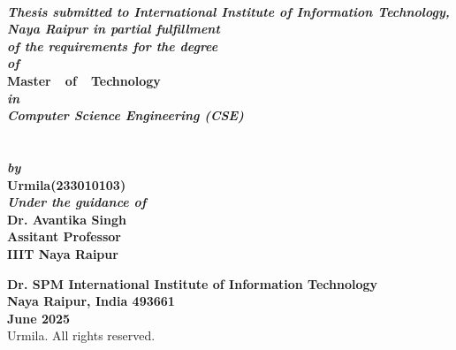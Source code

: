 \thispagestyle{plain}
\begin{center}
 {\huge \bf \\}
\vspace*{1.2cm}
{\bf{ \textit {Thesis submitted to International Institute of Information Technology, Naya Raipur in partial fulfillment \\
	of the requirements for the degree}}}\\ 
\vspace*{0.5cm}
{\bf{ \textit {of}}}\\
\vspace*{0.5cm}
{\Large {\bf Master\ \ of\ \ Technology}}\\
\vspace*{0.5cm}
{\bf{ \textit {in}}}\\
\vspace*{0.5cm}
{\bf{ \textit {Computer Science Engineering (CSE)}}}\\
\vspace*{0.5cm}\\
\vspace*{0.5cm}\\
{\bf{ \textit { by}}}\\
\vspace*{0.5cm}
{\Large{\bf Urmila(233010103)}}\\
\vspace*{1cm}
\bf{ \textit { Under the guidance of }}\\
\vspace*{0.5cm}
{{\bf Dr. Avantika Singh}}\\
\vspace*{0.40cm}
{{\bf Assitant Professor}}\\
\vspace*{0.40cm}
{{\bf IIIT Naya Raipur}}\\
\vspace*{0.10cm}
\begin{figure}[htbp]
  \centerline{}
\end{figure}
\vspace*{0.08cm}
{\Large \bf  Dr. SPM International Institute of Information Technology\\
Naya Raipur, India 493661\\
June 2025}\\
 Urmila. All rights reserved.
\end{center}

\clearpage

\thispagestyle{plain}
\clearpage
